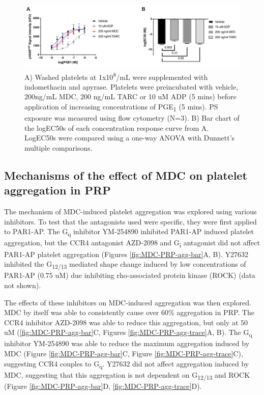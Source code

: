 \documentclass[11pt,twoside]{bristolthesis}
\begin{document}
\begin{figure}
\includegraphics[width=0.9\linewidth]{figure/Chemokines/Layouts/MDC_TARC_VASP_FACS_logec50} \caption[The effect of the chemokines MDC and TARC on phospho-VASP levels]{A) Washed platelets at 1x10\textsuperscript{8}/mL were supplemented with indomethacin and apyrase. Platelets were preincubated with vehicle, 200ng/mL MDC, 200 ng/mL TARC or 10 uM ADP (5 mins) before application of increasing concentrations of PGE\textsubscript{1} (5 mins). PS exposure was measured using flow cytometry (N=3). B) Bar chart of the logEC50s of each concentration response curve from A. LogEC50s were compared using a one-way ANOVA with Dunnett's multiple comparisons.}\label{fig:MDC-TARC-VASP-FACS}
\end{figure}
\hypertarget{mechanisms-of-the-effect-of-mdc-on-platelet-aggregation-in-prp}{%
\subsection{Mechanisms of the effect of MDC on platelet aggregation in PRP}\label{mechanisms-of-the-effect-of-mdc-on-platelet-aggregation-in-prp}}

The mechanism of MDC-induced platelet aggregation was explored using various inhibitors. To test that the antagonists used were specific, they were first applied to PAR1-AP. The G\textsubscript{q} inhibitor YM-254890 inhibited PAR1-AP induced platelet aggregation, but the CCR4 antagonist AZD-2098 and G\textsubscript{i} antagonist did not affect PAR1-AP platelet aggregation (Figures \ref{fig:MDC-PRP-agg-bar}A, B). Y27632 inhibited the G\textsubscript{12/13} mediated shape change induced by low concentrations of PAR1-AP (0.75 uM) due inhibiting rho-associated protein kinase (ROCK) (data not shown).

The effects of these inhibitors on MDC-induced aggregation was then explored. MDC by itself was able to consistently cause over 60\% aggregation in PRP. The CCR4 inhibitor AZD-2098 was able to reduce this aggregation, but only at 50 uM (\ref{fig:MDC-PRP-agg-bar}C, Figures \ref{fig:MDC-PRP-agg-trace}A, B). The G\textsubscript{q} inhibitor YM-254890 was able to reduce the maximum aggregation induced by MDC (Figure \ref{fig:MDC-PRP-agg-bar}C, Figure \ref{fig:MDC-PRP-agg-trace}C), suggesting CCR4 couples to G\textsubscript{q}. Y27632 did not affect aggregation induced by MDC, suggesting that this aggregation is not dependent on G\textsubscript{12/13} and ROCK (Figure \ref{fig:MDC-PRP-agg-bar}D, \ref{fig:MDC-PRP-agg-trace}D).
\end{document}

